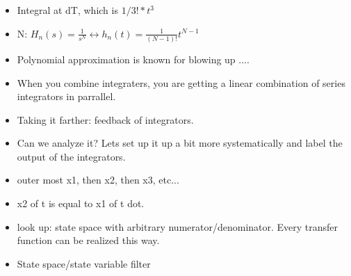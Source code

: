 \begin{itemize}
\item{
Integral at dT, which is $1/3! * t^3$
}

\item{
N: $H_n(s) = \frac{1}{s^N} \leftrightarrow h_n(t) = \frac{1}{(N - 1)!}t^{N - 1}$
}

\item{
Polynomial approximation is known for blowing up ....
}

\item{
When you combine integraters, you are getting a linear combination of series integrators in parrallel. 
}

\item{
Taking it farther: feedback of integrators.
}

\item{
Can we analyze it? Lets set up it up a bit more systematically and label the output of the integrators.
}

\item{
outer most x1, then x2, then x3, etc...
}

\item{
x2 of t is equal to x1 of t dot.
}

\item{
look up: state space with arbitrary numerator/denominator. Every transfer function can be realized this way. 
}


\item{
State space/state variable filter
}
\end{itemize}
